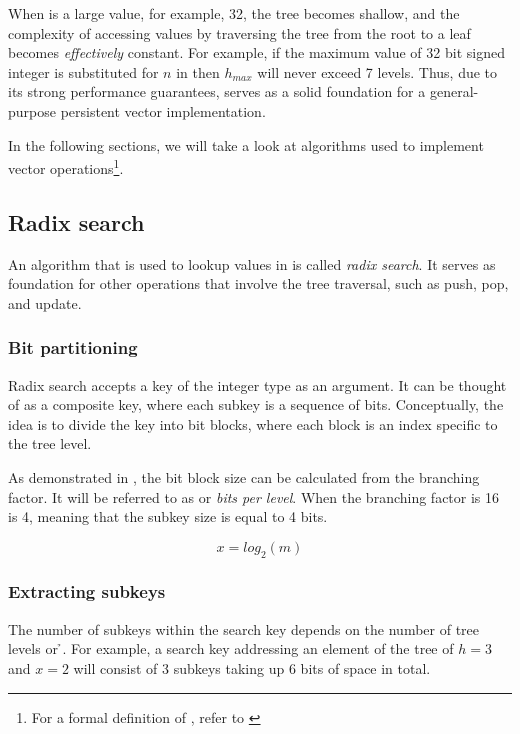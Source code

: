 When \m{} is a large value, for example, 32, the tree becomes shallow, and the complexity of accessing values by traversing the tree from the root to a leaf becomes \emph{effectively} constant. For example, if the maximum value of 32 bit signed integer is substituted for $n$ in  then $h_{max}$ will never exceed 7 levels. Thus, due to its strong performance guarantees, \treerb{} serves as a solid foundation for a general-purpose persistent vector implementation.

In the following sections, we will take a look at \treerb{} algorithms used to implement vector operations\footnote{For a formal definition of \treerb{}, refer to \cite{improving-performance-through-transience}}.

\subsection{Radix search}
\label{sec:rb-tree-radix-search}

An algorithm that is used to lookup values in \treerb{} is called \emph{radix search}. It serves as foundation for other operations that involve the tree traversal, such as push, pop, and update.

\subsubsection*{Bit partitioning}
Radix search accepts a key of the integer type as an argument. It can be thought of as a composite key, where each subkey is a sequence of bits. Conceptually, the idea is to divide the key into bit blocks, where each block is an index specific to the tree level.

As demonstrated in , the bit block size can be calculated from the branching factor. It will be referred to as \x{} or \emph{bits per level}. When the branching factor \m{} is 16 \x{} is 4, meaning that the subkey size is equal to 4 bits.

\begin{equation}
    \label{eq:bits-per-level}
    x = log_2(m)
\end{equation}

\subsubsection*{Extracting subkeys}
The number of subkeys within the search key depends on the number of tree levels or \h{}. For example, a search key addressing an element of the tree of ${h = 3}$ and ${x = 2}$ will consist of 3 subkeys taking up 6 bits of space in total.

